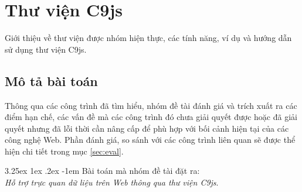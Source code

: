 \documentclass[12pt,a4paper]{article}
\makeatletter
\newcommand{\myparagraph}[1]{\paragraph{#1}\mbox{}\\} %
\renewcommand\paragraph{\@startsection{paragraph}{5}{\z@}%
  {3.25ex \@plus1ex \@minus.2ex}%
  {-1em}%
  {\normalfont\normalsize\bfseries}}
\makeatother
\begin{document}
\section{Thư viện C9js}
Giới thiệu về thư viện được nhóm hiện thực, các tính năng, ví dụ và hướng dẫn sử dụng thư viện C9js.
\subsection{Mô tả bài toán}
Thông qua các công trình đã tìm hiểu, nhóm đề tài đánh giá và trích xuất ra các điểm hạn chế, các vấn đề mà các công trình đó chưa giải quyết được hoặc đã giải quyết nhưng đã lỗi thời cần nâng cấp để phù hợp với bối cảnh hiện tại của các công nghệ Web. Phần đánh giá, so sánh với các công trình liên quan sẽ được thể hiện chi tiết trong mục \ref{sec:eval}.

\myparagraph{Bài toán mà nhóm đề tài đặt ra:}
\textit{Hỗ trợ trực quan dữ liệu trên Web thông qua thư viện C9js}.
 
\end{document}
